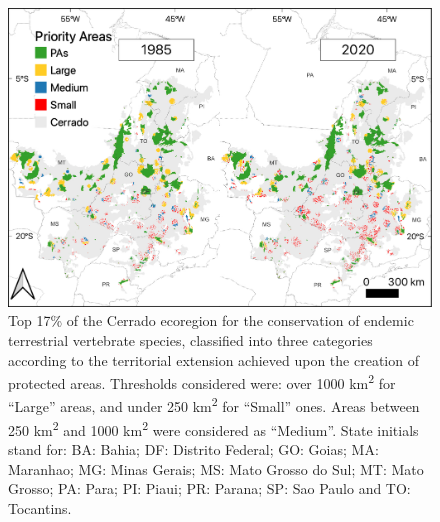 \documentclass[12pt,openright,oneside,a4paper,english]{abntex2}
\begin{document}
\begin{figure}[H]
	\centering
	\includegraphics[width=160mm]{Fig c3-2}
	\caption[Top 17\% of the Cerrado ecoregion classified in distinct size categories]{\small Top 17\% of the Cerrado ecoregion for the conservation of endemic terrestrial vertebrate species, classified into three categories according to the territorial extension achieved upon the creation of protected areas. Thresholds considered were: over 1000 km\textsuperscript{2} for “Large” areas, and under 250 km\textsuperscript{2} for “Small” ones. Areas between 250 km\textsuperscript{2} and 1000 km\textsuperscript{2} were considered as “Medium”. State initials stand for: BA: Bahia; DF: Distrito Federal; GO: Goias; MA: Maranhao; MG: Minas Gerais; MS: Mato Grosso do Sul; MT: Mato Grosso; PA: Para; PI: Piaui; PR: Parana; SP: Sao Paulo and TO: Tocantins.}
	\label{fig:fig3-2}
\end{figure}
\end{document}
